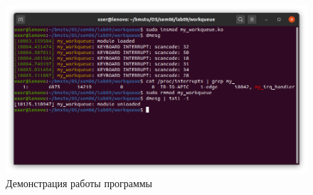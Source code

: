 \documentclass[a4paper,oneside,12pt]{extreport}
\begin{document}


\begin{figure}[H]
	\centering
	\includegraphics[width=\linewidth]{inc/img/workqueue}
	\caption{Демонстрация работы программы}
	\label{img:workqueue}
\end{figure}
\end{document}
